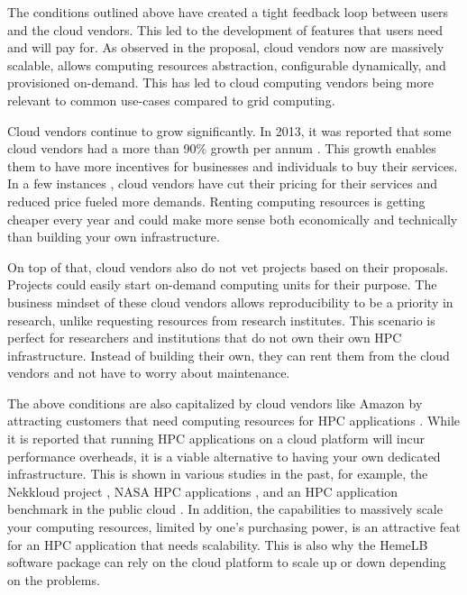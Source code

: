 The conditions outlined above have created a tight feedback loop between users and the cloud vendors. This led to the development of features that users need and will pay for. As observed in the proposal, cloud vendors now are massively scalable, allows computing resources abstraction, configurable dynamically, and provisioned on-demand. This has led to cloud computing vendors being more relevant to common use-cases compared to grid computing.

Cloud vendors continue to grow significantly. In 2013, it was reported that some cloud vendors had a more than 90\% growth per annum \citep{FSN.O51:online}. This growth enables them to have more incentives for businesses and individuals to buy their services. In a few instances \citep{AWSPr74:online, Annou90:online, Googl18:online}, cloud vendors have cut their pricing for their services and reduced price fueled more demands. Renting computing resources is getting cheaper every year and could make more sense both economically and technically than building your own infrastructure.

On top of that, cloud vendors also do not vet projects based on their proposals. Projects could easily start on-demand computing units for their purpose. The business mindset of these cloud vendors allows reproducibility to be a priority in research, unlike requesting resources from research institutes.  This scenario is perfect for researchers and institutions that do not own their own HPC infrastructure. Instead of building their own, they can rent them from the cloud vendors and not have to worry about maintenance.

The above conditions are also capitalized by cloud vendors like Amazon by attracting customers that need computing resources for HPC applications \citep{Micro31:online}. While it is reported that running HPC applications on a cloud platform will incur performance overheads, it is a viable alternative to having your own dedicated infrastructure. This is shown in various studies in the past, for example, the Nekkloud project \citep{cohen2013nekkloud}, NASA HPC applications \citep{mehrotra2012performance}, and an HPC application benchmark in the public cloud \citep{he2010case}. In addition, the capabilities to massively scale your computing resources, limited by one's purchasing power, is an attractive feat for an HPC application that needs scalability. This is also why the HemeLB software package can rely on the cloud platform to scale up or down depending on the problems. 



